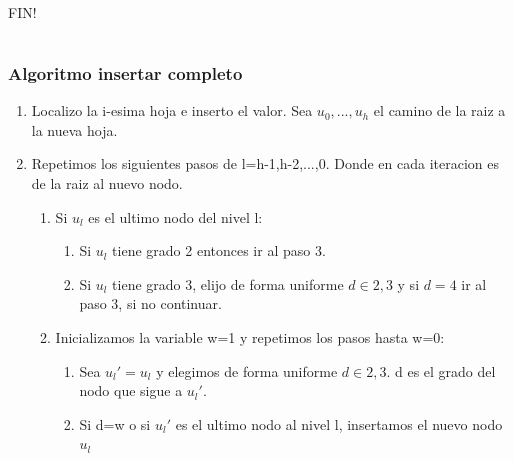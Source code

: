 \documentclass[10pt]{beamer}
\begin{document}

\section{}
\begin{frame}
\frametitle{}

\huge
\centering
FIN!
\end{frame}


\section{}
\begin{frame}[noframenumbering]
  \frametitle{Algoritmo insertar completo}
\small
\begin{enumerate}\itemsep0em
  \item Localizo la i-esima hoja e inserto el valor. Sea $u_0,...,u_h$ el camino
    de la raiz a la nueva hoja.
  \item Repetimos los siguientes pasos de l=h-1,h-2,...,0. Donde en cada iteracion
    es de la raiz al nuevo nodo.
    \vspace{-0.05cm}
    \begin{enumerate}[a]\itemsep0em
      \item Si $u_l$ es el ultimo nodo del nivel l:
        \vspace{-0.05cm}
        \begin{enumerate}[i]\itemsep0em
          \item Si $u_l$ tiene grado 2 entonces ir al paso 3.
          \item Si $u_l$ tiene grado 3, elijo de forma uniforme $d\in{2,3}$ y si
            $d=4$ ir al paso 3, si no continuar.
        \end{enumerate}
      \item Inicializamos la variable w=1 y repetimos los pasos hasta w=0:
        \vspace{-0.05cm}
        \begin{enumerate}[i]\itemsep0em
          \item Sea $u_l'=u_l$ y elegimos de forma uniforme $d\in{2,3}$. d es el grado
            del nodo que sigue a $u_l'$.
          \item Si d=w o si $u_l'$ es el ultimo nodo al nivel l, insertamos el nuevo nodo $u_l$

\end{enumerate}
\end{enumerate}
\end{enumerate}
\end{frame}
\end{document}
